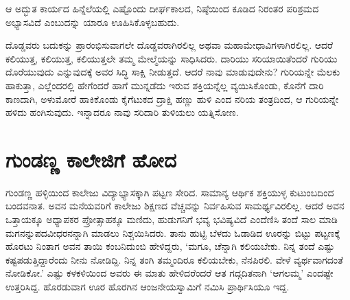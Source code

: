 ಆ ಅದ್ಭುತ ಕಾರ್ಯದ ಹಿನ್ನೆಲೆಯಲ್ಲಿ ಎಷ್ಟೊಂದು ದೀರ್ಘಕಾಲದ, ನಿಷ್ಠೆಯಿಂದ ಕೂಡಿದ ನಿರಂತರ ಪರಿಶ್ರಮದ ಅಭ್ಯಾಸವಿದೆ ಎಂಬುದನ್ನು ಯಾರೂ ಊಹಿಸಿಕೊಳ್ಳಬಹುದು.

ದೊಡ್ಡವರು ಬದುಕನ್ನು ಪ್ರಾರಂಭಿಸುವಾಗಲೇ ದೊಡ್ಡವರಾಗಿರಲಿಲ್ಲ ಅಥವಾ ಮಹಾ\break ಮೇಧಾವಿಗಳಾಗಿರಲಿಲ್ಲ. ಆದರೆ ಕಲಿಯುತ್ತ, ಕಲಿಯುತ್ತ, ಕಲಿಯುತ್ತಲೇ ತಮ್ಮ ಮೇಲ್ಮೆಯನ್ನು ಸಾಧಿಸಿದರು. ದಾರಿಯು ಸರಿಯಾಯಿತೆಂದರೆ ಗುರಿಯು ದೊರೆಯುವುದು ಎನ್ನುವುದಕ್ಕೆ ಅವರ ಸಿದ್ಧಿ ಸಾಕ್ಷಿ ನೀಡುತ್ತದೆ. ಆದರೆ ನಾವು ಮಾಡುವುದೇನು? ಗುರಿಯನ್ನೇ ಮೆಲಕು ಹಾಕುತ್ತಾ, ಎಲ್ಲೆಂದರಲ್ಲಿ ಹೇಗೆಂದರೆ ಹಾಗೆ ಮುನ್ನಡೆದು ಇರುವ ಶಕ್ತಿಯನ್ನೆಲ್ಲ ವ್ಯಯಿಸಿಕೊಂಡು, ಕೊನೆಗೆ ದಾರಿ ಕಾಣದಾಗಿ, ಅಳುಮೋರೆ ಹಾಕಿಕೊಂಡು ಕೈಗೆಟುಕದ ದ್ರಾಕ್ಷಿ ಹಣ್ಣು ಹುಳಿ ಎಂದ ನರಿಯ ತಂತ್ರದಿಂದ, ಆ ಗುರಿಯನ್ನೇ ಹಳಿದು ಹಂಗಿಸುವುದು. ಇನ್ನಾದರೂ ನಾವು ಸರಿದಾರಿ ತುಳಿಯಲು ಯತ್ನಿಸೋಣ.


\section*{ಗುಂಡಣ್ಣ ಕಾಲೇಜಿಗೆ ಹೋದ}


ಗುಂಡಣ್ಣ ಹಳ್ಳಿಯಿಂದ ಕಾಲೇಜು ವಿದ್ಯಾಭ್ಯಾಸಕ್ಕಾಗಿ ಪಟ್ಟಣ ಸೇರಿದ. ಸಾಮಾನ್ಯ ಆರ್ಥಿಕ ಶಕ್ತಿಯುಳ್ಳ ಕುಟುಂಬದಿಂದ ಬಂದವನಾತ. ಅವನ ಮನೆಯವರಿಗೆ ಕಾಲೇಜು ಶಿಕ್ಷಣದ ವೆಚ್ಚವನ್ನು ನಿರ್ವಹಿಸುವ ಸಾಮರ್ಥ್ಯವಿರಲಿಲ್ಲ. ಆದರೆ ಅವನ ಒತ್ತಾಯಕ್ಕೂ ಅಧ್ಯಾಪಕರ ಪ್ರೋತ್ಸಾಹಕ್ಕೂ ಮಣಿದು, ಹುಡುಗನಿಗೆ ಭವ್ಯ ಭವಿಷ್ಯವಿದೆ ಎಂದೆಣಿಸಿ ತಂದೆ ಸಾಲ ಮಾಡಿ ಮಗನನ್ನು\break ಪದವೀಧರನನ್ನಾಗಿ ಮಾಡಲು ನಿಶ್ಚಯಿಸಿದರು. ತಾನು ಹುಟ್ಟಿ ಬೆಳದು ಓಡಾಡಿದ ಊರನ್ನು ಬಿಟ್ಟು ಪಟ್ಟಣಕ್ಕೆ ಹೊರಟು ನಿಂತಾಗ ಅವನ ತಾಯಿ ಕಂಬನಿದುಂಬಿ ಹೇಳಿದ್ದರು, ‘ಮಗೂ, ಚೆನ್ನಾಗಿ ಕಲಿಯಬೇಕು. ನಿನ್ನ ತಂದೆ ಎಷ್ಟು ಕಷ್ಟಪಡುತ್ತಿದ್ದಾರೆಂದು ನೀನು ನೋಡಿದ್ದಿ. ನಿನ್ನ ತಂಗಿ ತಮ್ಮಂದಿರೂ ಕಲಿಯಬೇಕು, ನೆನಪಿರಲಿ. ವೇಳೆ ವ್ಯರ್ಥವಾಗದಂತೆ ನೋಡಿಕೋ.’ ಎಷ್ಟು ಕಳಕಳಿಯಿಂದ ಅವರು ಈ ಮಾತು ಹೇಳಿದರೆಂದರೆ ಆತ ಗದ್ಗದಿತನಾಗಿ ‘ಆಗಲಮ್ಮ’ ಎಂದಷ್ಟೇ ಉತ್ತರಿಸಿದ್ದ. ಹೊರಡುವಾಗ ಊರ ಹೊರಗಿನ ಆಂಜನೇಯಸ್ವಾಮಿಗೆ ನಮಿಸಿ ಪ್ರಾರ್ಥಿಸಿಯೂ ಇದ್ದ.

